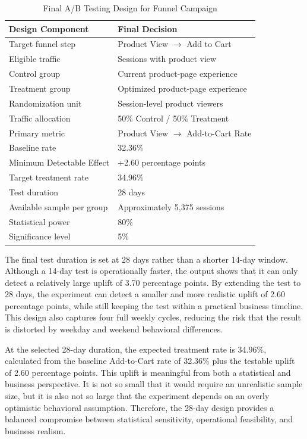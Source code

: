 \documentclass[conference]{IEEEtran}
\begin{document}
\begin{table}[H]
\centering
\caption{Final A/B Testing Design for Funnel Campaign}
\label{tab:funnel_ab_final_design}

\renewcommand{\arraystretch}{1.3}
\setlength{\tabcolsep}{5pt}
\footnotesize

\begin{tabular}{|l|l|}
\toprule
\textbf{Design Component} & \textbf{Final Decision} \\
\midrule
Target funnel step & Product View $\rightarrow$ Add to Cart \\
Eligible traffic & Sessions with product view \\
Control group & Current product-page experience \\
Treatment group & Optimized product-page experience \\
Randomization unit & Session-level product viewers \\
Traffic allocation & 50\% Control / 50\% Treatment \\
Primary metric & Product View $\rightarrow$ Add-to-Cart Rate \\
Baseline rate & 32.36\% \\
Minimum Detectable Effect & +2.60 percentage points \\
Target treatment rate & 34.96\% \\
Test duration & 28 days \\
Available sample per group & Approximately 5,375 sessions \\
Statistical power & 80\% \\
Significance level & 5\% \\
\bottomrule
\end{tabular}
\end{table}

The final test duration is set at 28 days rather than a shorter 14-day window. Although a 14-day test is operationally faster, the output shows that it can only detect a relatively large uplift of 3.70 percentage points. By extending the test to 28 days, the experiment can detect a smaller and more realistic uplift of 2.60 percentage points, while still keeping the test within a practical business timeline. This design also captures four full weekly cycles, reducing the risk that the result is distorted by weekday and weekend behavioral differences.

At the selected 28-day duration, the expected treatment rate is 34.96\%, calculated from the baseline Add-to-Cart rate of 32.36\% plus the testable uplift of 2.60 percentage points. This uplift is meaningful from both a statistical and business perspective. It is not so small that it would require an unrealistic sample size, but it is also not so large that the experiment depends on an overly optimistic behavioral assumption. Therefore, the 28-day design provides a balanced compromise between statistical sensitivity, operational feasibility, and business realism.
\end{document}
